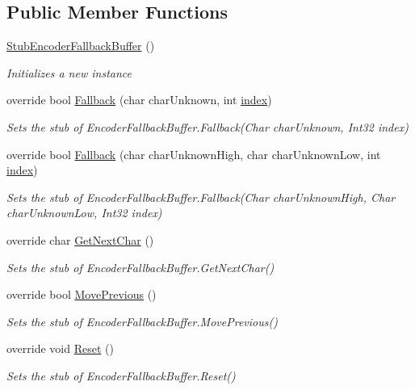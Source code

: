\subsection*{Public Member Functions}
\begin{DoxyCompactItemize}
\item 
\hyperlink{class_system_1_1_text_1_1_fakes_1_1_stub_encoder_fallback_buffer_a038c9388fe3d2dff31af06bc62c3f5a1}{Stub\-Encoder\-Fallback\-Buffer} ()
\begin{DoxyCompactList}\small\item\em Initializes a new instance\end{DoxyCompactList}\item 
override bool \hyperlink{class_system_1_1_text_1_1_fakes_1_1_stub_encoder_fallback_buffer_a1d8cc1284b8c9f9f2b1d8201d89cdc71}{Fallback} (char char\-Unknown, int \hyperlink{jquery-1_810_82-vsdoc_8js_a75bb12d1f23302a9eea93a6d89d0193e}{index})
\begin{DoxyCompactList}\small\item\em Sets the stub of Encoder\-Fallback\-Buffer.\-Fallback(\-Char char\-Unknown, Int32 index)\end{DoxyCompactList}\item 
override bool \hyperlink{class_system_1_1_text_1_1_fakes_1_1_stub_encoder_fallback_buffer_ad033a9526e3fd1da697d213696d22220}{Fallback} (char char\-Unknown\-High, char char\-Unknown\-Low, int \hyperlink{jquery-1_810_82-vsdoc_8js_a75bb12d1f23302a9eea93a6d89d0193e}{index})
\begin{DoxyCompactList}\small\item\em Sets the stub of Encoder\-Fallback\-Buffer.\-Fallback(\-Char char\-Unknown\-High, Char char\-Unknown\-Low, Int32 index)\end{DoxyCompactList}\item 
override char \hyperlink{class_system_1_1_text_1_1_fakes_1_1_stub_encoder_fallback_buffer_ac5dbe4bbe8af2761238736ed7ff8b036}{Get\-Next\-Char} ()
\begin{DoxyCompactList}\small\item\em Sets the stub of Encoder\-Fallback\-Buffer.\-Get\-Next\-Char()\end{DoxyCompactList}\item 
override bool \hyperlink{class_system_1_1_text_1_1_fakes_1_1_stub_encoder_fallback_buffer_a7aca6164fa76970923487ecc58c74d54}{Move\-Previous} ()
\begin{DoxyCompactList}\small\item\em Sets the stub of Encoder\-Fallback\-Buffer.\-Move\-Previous()\end{DoxyCompactList}\item 
override void \hyperlink{class_system_1_1_text_1_1_fakes_1_1_stub_encoder_fallback_buffer_a723979a29530077ac679169e40f6eca5}{Reset} ()
\begin{DoxyCompactList}\small\item\em Sets the stub of Encoder\-Fallback\-Buffer.\-Reset()\end{DoxyCompactList}\end{DoxyCompactItemize}
